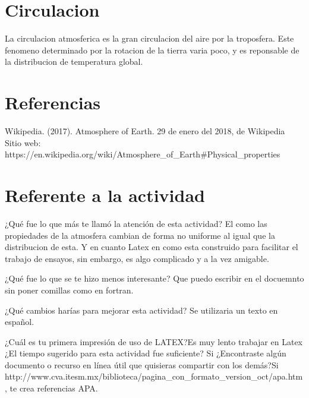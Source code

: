 \documentclass{article}
\begin{document}
\section{Circulacion}

La circulacion atmosferica es la gran circulacion del aire por la troposfera. Este fenomeno determinado por la rotacion de la tierra varia poco,  y es reponsable de la distribucion de temperatura global.

\section{Referencias}
Wikipedia. (2017). Atmosphere of Earth. 29 de enero del 2018, de Wikipedia Sitio web: https://en.wikipedia.org/wiki/Atmosphere\_of\_Earth\#Physical\_properties

\section{Referente a la actividad}

¿Qué fue lo que más te llamó la atención de esta actividad?
El como las propiedades de la atmosfera cambian de forma no uniforme al igual que la distribucion de esta.  Y en cuanto Latex en como esta construido para facilitar el trabajo de ensayos, sin embargo, es algo complicado y a la vez amigable.
\linebreak

¿Qué fue lo que se te hizo menos interesante?
Que puedo escribir en el docuemnto sin poner comillas como en fortran.
\linebreak

¿Qué cambios harías para mejorar esta actividad? 
Se utilizaria un texto en español.
\linebreak

¿Cuál es tu primera impresión de uso de LATEX?Es muy lento trabajar en Latex
\linebreak
¿El tiempo sugerido para esta actividad fue suficiente? Si
\linebreak
¿Encontraste algún documento o recurso en línea útil que quisieras compartir con los demás?Si
\linebreak
http://www.cva.itesm.mx/biblioteca/pagina\_con\_formato\_version\_oct/apa.htm, te crea referencias APA.
\end{document}
